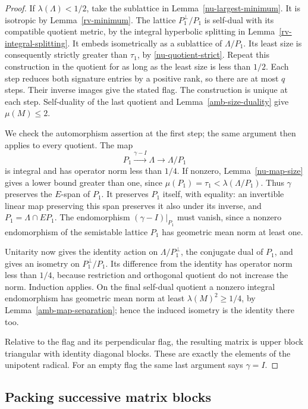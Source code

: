 \begin{proof}
If $\lambda(\Lambda)<1/2$, take the sublattice in
Lemma~\ref{nu-largest-minimum}.  It is isotropic
by Lemma~\ref{rv-minimum}.  The lattice
$P_1^\perp/P_1$ is self-dual with its compatible
quotient metric, by the integral hyperbolic
splitting in Lemma~\ref{rv-integral-splitting}.
It embeds isometrically as a sublattice of
$\Lambda/P_1$.  Its least size is consequently
strictly greater than $\tau_1$, by
\eqref{nu-quotient-strict}.  Repeat this construction
in the quotient for as long as the least size is
less than $1/2$.
Each step reduces both signature entries by a
positive rank, so there are at most $q$ steps.
Their inverse images give the stated flag.
The construction is unique at each step.
Self-duality of the last quotient and
Lemma~\ref{amb-size-duality} give $\mu(M)\le2$.

We check the automorphism assertion at the first
step; the same argument then applies to every
quotient.  The map
\[
        P_1\xrightarrow{\gamma-I}\Lambda
                                  \longrightarrow\Lambda/P_1
\]
is integral and has operator norm less than $1/4$.
If nonzero, Lemma~\ref{nu-map-size} gives a lower
bound greater than one, since
$\mu(P_1)=\tau_1<\lambda(\Lambda/P_1)$.
Thus $\gamma$ preserves the $E$-span of $P_1$.
It preserves $P_1$ itself, with equality: an
invertible linear map preserving this span
preserves it also under its inverse, and
$P_1=\Lambda\cap EP_1$.
The endomorphism $(\gamma-I)|_{P_1}$ must vanish,
since a nonzero endomorphism of the semistable
lattice $P_1$ has geometric mean norm at least one.

Unitarity now gives the identity action on
$\Lambda/P_1^\perp$, the conjugate dual of $P_1$,
and gives an isometry on $P_1^\perp/P_1$.
Its difference from the identity has operator
norm less than $1/4$, because restriction and
orthogonal quotient do not increase the norm.
Induction applies.  On the final self-dual
quotient a nonzero integral endomorphism has
geometric mean norm at least
$\lambda(M)^2\ge1/4$, by
Lemma~\ref{amb-map-separation}; hence the induced
isometry is the identity there too.

Relative to the flag and its perpendicular flag,
the resulting matrix is upper block triangular
with identity diagonal blocks.  These are exactly
the elements of the unipotent radical.  For an
empty flag the same last argument says $\gamma=I$.
\end{proof}

\subsection{Packing successive matrix blocks}

